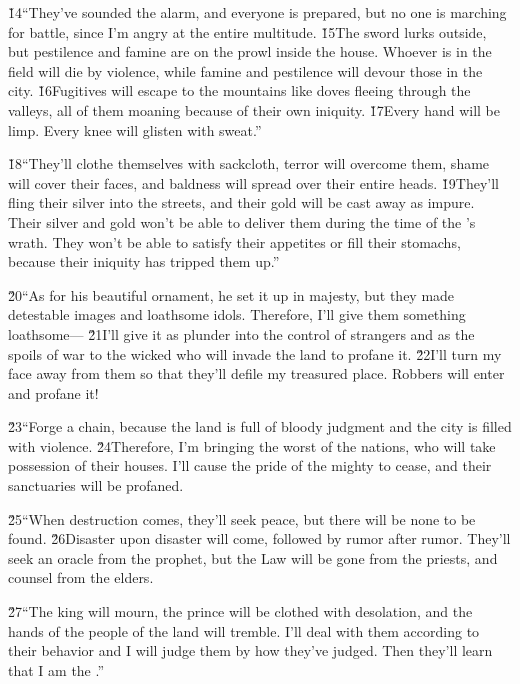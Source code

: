 \v{14}``They've sounded the alarm, and everyone is prepared, but no one is marching for battle, since I'm angry at the entire multitude. \v{15}The sword lurks outside, but pestilence and famine are on the prowl inside the house. Whoever is in the field will die by violence, while famine and pestilence will devour those in the city. \v{16}Fugitives will escape to the mountains like doves fleeing through the valleys, all of them moaning because of their own iniquity. \v{17}Every hand will be limp. Every knee will glisten with sweat.''

\v{18}``They'll clothe themselves with sackcloth, terror will overcome them, shame will cover their faces, and baldness will spread over their entire heads. \v{19}They'll fling their silver into the streets, and their gold will be cast away as impure. Their silver and gold won't be able to deliver them during the time of the 's wrath. They won't be able to satisfy their appetites or fill their stomachs, because their iniquity has tripped them up.''

\v{20}``As for his beautiful ornament, he set it up in majesty, but they made detestable images and loathsome idols. Therefore, I'll give them something loathsome--- \v{21}I'll give it as plunder into the control of strangers and as the spoils of war to the wicked who will invade the land to profane it. \v{22}I'll turn my face away from them so that they'll defile my treasured place. Robbers will enter and profane it!

\v{23}``Forge a chain, because the land is full of bloody judgment and the city is filled with violence. \v{24}Therefore, I'm bringing the worst of the nations, who will take possession of their houses. I'll cause the pride of the mighty to cease, and their sanctuaries will be profaned.

\v{25}``When destruction comes, they'll seek peace, but there will be none to be found. \v{26}Disaster upon disaster will come, followed by rumor after rumor. They'll seek an oracle from the prophet, but the Law will be gone from the priests, and counsel from the elders.

\v{27}``The king will mourn, the prince will be clothed with desolation, and the hands of the people of the land will tremble. I'll deal with them according to their behavior and I will judge them by how they've judged. Then they'll learn that I am the .''

